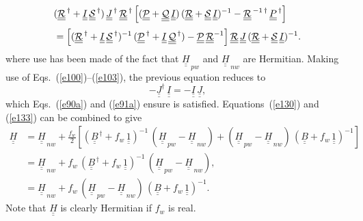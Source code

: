 \documentclass[12pt,prb,aps,notitlepage]{revtex4-1}
\begin{document}
\begin{align}
&(\underline{\underline{\cal R}}^{\,\dag}+\underline{\underline{I}}\,\underline{\underline{\cal S}}^{\,\dag})\,\underline{\underline{J}}^{\,\dag}\,\underline{\underline{\cal R}}^{\,\dag}
\left[(\underline{\underline{\cal P}}+\underline{\underline{\cal Q}}\,\underline{\underline{I}})\,(\underline{\underline{\cal R}}+\underline{\underline{\cal S}}\,\underline{\underline{I}})^{-1}
 -\underline{\underline{\cal R}}^{\,-1\,\dag}\,\underline{\underline{P}}^{\,\dag}\right]\nonumber\\[0.5ex]
 &=
  \left[(\underline{\underline{\cal R}}^{\,\dag}+
 \underline{\underline{I}}\,\underline{\underline{\cal S}}^{\,\dag})^{-1}\,(\underline{\underline{\cal P}}^{\,\dag}
 +\underline{\underline{I}}\,\underline{\underline{\cal Q}}^{\,\dag})
 -\underline{\underline{\cal P}}\,\underline{\underline{\cal R}}^{-1}\right]\underline{\underline{\cal R}}\,\underline{\underline{J}}\,(\underline{\underline{\cal R}} + \underline{\underline{\cal S}}\,\underline{\underline{I}})^{-1}.
\end{align}
where use has been made of the fact that $\underline{\underline{H}}_{\,pw}$ and $\underline{\underline{H}}_{\,nw}$ are Hermitian. 
Making use of Eqs.~(\ref{e100})--(\ref{e103}), the previous equation reduces to 
\begin{equation}
-\underline{\underline{J}}^\dag\,\underline{\underline{I}}= -\underline{\underline{I}}\,\underline{\underline{J}},
\end{equation}
which  Eqs.~(\ref{e90a}) and (\ref{e91a}) ensure is satisfied. Equations~(\ref{e130}) and (\ref{e133}) can
be combined to give
\begin{align}\label{e128x}
\underline{\underline{H}} &= \underline{\underline{H}}_{\,nw} 
+\frac{ f_w}{2}\left[ 
(\underline{\underline{B}}^{\,\dag}+f_w\,\underline{\underline{1}})^{-1}\,( \underline{\underline{H}}_{\,pw} - \underline{\underline{H}}_{\,nw} )
+(\underline{\underline{H}}_{\,pw} - \underline{\underline{H}}_{\,nw} )\,(\underline{\underline{B}}+f_w\,\underline{\underline{1}})^{-1} \right]\nonumber\\[0.5ex]
&= \underline{\underline{H}}_{\,nw} +f_w\,(\underline{\underline{B}}^{\,\dag}+f_w\,\underline{\underline{1}})^{-1}\,( \underline{\underline{H}}_{\,pw} - \underline{\underline{H}}_{\,nw} ),\nonumber\\[0.5ex]
&= \underline{\underline{H}}_{\,nw} +f_w\,(\underline{\underline{H}}_{\,pw} - \underline{\underline{H}}_{\,nw} )\,(\underline{\underline{B}}+f_w\,\underline{\underline{1}})^{-1}.
\end{align}
Note that $\underline{\underline{H}}$ is clearly Hermitian if $f_w$ is real. 
\end{document}
